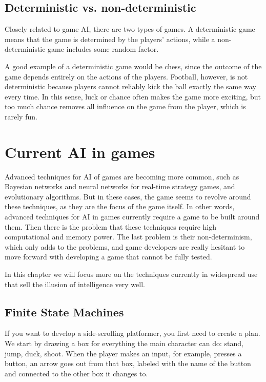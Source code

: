 \documentclass[a4paper,12pt,openright]{book}
\begin{document}
\section{Deterministic vs. non-deterministic}
Closely related to game AI, there are two types of games. 
A deterministic game \cite{DeepLearningGO} means that the game is determined by the players' actions, while a non-deterministic game includes some random factor.

A good example of a deterministic game would be chess, since the outcome of the game depends entirely on the actions of the players. Football, however, is not deterministic because players cannot reliably kick the ball exactly the same way every time. In this sense, luck or chance often makes the game more exciting, but too much chance removes all influence on the game from the player, which is rarely fun.

\chapter{Current AI in games}
\label{ch2}

Advanced techniques for AI of games are becoming more common, such as Bayesian networks and neural networks for real-time strategy games, and evolutionary algorithms. But in these cases, the game seems to revolve around these techniques, as they are the focus of the game itself. In other words, advanced techniques for AI in games currently require a game to be built around them. Then there is the problem that these techniques require high computational and memory power. The last problem is their non-determinism, which only adds to the problems, and game developers are really hesitant to move forward with developing a game that cannot be fully tested.

In this chapter we will focus more on the techniques currently in widespread use that sell the illusion of intelligence very well.

\section{Finite State Machines}

If you want to develop a side-scrolling platformer, you first need to create a plan. We start by drawing a box for everything the main character can do: stand, jump, duck, shoot. When the player makes an input, for example, presses a button, an arrow goes out from that box, labeled with the name of the button and connected to the other box it changes to.
\end{document}
